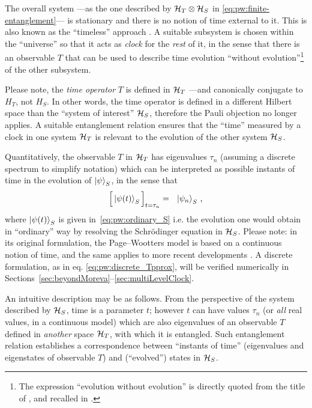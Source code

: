 The overall system
---as the one described by $\mathcal{H}_T \otimes \mathcal{H}_S$ in \eqref{eq:pw:finite-entanglement}---
is stationary and there is no notion
of time external to it.
This is also known as the
``timeless'' approach \parencite{Marletto:Evolution}.
\citereset
A suitable subsystem is chosen within the ``universe'' so that it acts as
\emph{clock} for the \emph{rest} of it, in the sense that
there is an observable $T$
that can be used to
describe time evolution ``without evolution''\footnote{
  The expression ``evolution without evolution''
  is directly quoted from the title of \cite{PageWootters},
  and recalled in \cite{Marletto:Evolution}.
}
of the other subsystem.

Please note,
the \emph{time operator} $T$ is defined in $\mathcal{H}_T$ ---and canonically conjugate to $H_T$, not $H_S$.
In other words, the time operator is defined in a different Hilbert space than the ``system of interest'' $\mathcal{H}_S$,
therefore
the Pauli objection no longer applies. A suitable entanglement relation ensures that 
the ``time'' measured by a clock in one system $\mathcal{H}_T$ is relevant to the evolution of the other
system $\mathcal{H}_S$.

Quantitatively,
the observable $T$ in $\mathcal{H}_T$
has eigenvalues $\tau_n$
(assuming a discrete spectrum to simplify notation)
which can be interpreted as possible
instants of time in the evolution of $\ket{\psi}_S$, in the sense that
\begin{equation}\label{eq:pw:discrete_Tpprox}
  \Big[ \ket{\psi(t)}_S \Big]_{t=\tau_n} = \,\,\,\, \ket{\psi_n}_S \, \text{,}
\end{equation}
where $\ket{\psi(t)}_S$ is given in~\eqref{eq:pw:ordinary_S} i.e.
the evolution one would obtain in ``ordinary'' way
by resolving the Schr\"{o}dinger equation in $\mathcal{H}_S$.
Please note:
in its original formulation, the Page--Wootters model is based on a continuous
notion of time, and the same applies to more recent developments \parencite{Lloyd:Time}.
A discrete formulation, as in eq. \eqref{eq:pw:discrete_Tpprox},
will be verified numerically in Sections~\ref{sec:beyondMoreva}--\ref{sec:multiLevelClock}.

An intuitive description may be as follows.
From the perspective of the system described by $\mathcal{H}_S$,
time is a parameter $t$;
however $t$ can have values
$\tau_n$ (or \emph{all} real values, in a continuous model)
which are also eigenvalues of an observable $T$ defined in \emph{another} space $\mathcal{H}_T$,
with which it is entangled. Such entanglement relation establishes a correspondence
between ``instants of time'' (eigenvalues and eigenstates of observable $T$)
and (``evolved'') states in $\mathcal{H}_S$.

